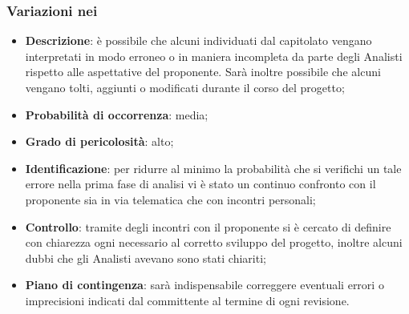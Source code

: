 \subsubsection{Variazioni nei }
\begin{itemize}
			\item \textbf{Descrizione}: è possibile che alcuni  individuati dal capitolato vengano interpretati in modo erroneo o in maniera incompleta da parte degli Analisti rispetto alle aspettative del proponente. Sarà inoltre possibile che alcuni  vengano tolti, aggiunti o modificati durante il corso del progetto;
			\item \textbf{Probabilità di occorrenza}: media;
			\item \textbf{Grado di pericolosità}: alto;
			\item \textbf{Identificazione}: per ridurre al minimo la probabilità che si verifichi un tale errore nella prima fase di analisi vi è stato un continuo confronto con il proponente sia in via telematica che con incontri personali;
			\item \textbf{Controllo}: tramite degli incontri con il proponente si è cercato di definire con chiarezza ogni  necessario al corretto sviluppo del progetto, inoltre alcuni dubbi che gli Analisti avevano sono stati chiariti;
			\item \textbf{Piano di contingenza}: sarà indispensabile correggere eventuali errori o imprecisioni indicati dal committente al termine di ogni revisione.
\end{itemize}
